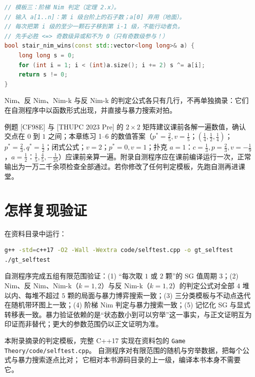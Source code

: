 \begin{lstlisting}[language=C++]
// 模板三：阶梯 Nim 判定（定理 2.x）。
// 输入 a[1..n]：第 i 级台阶上的石子数；a[0] 弃用（地面）。
// 每次把第 i 级的至少一颗石子移到第 i-1 级，不能行动者负。
// 先手必胜 <=> 奇数级异或和不为 0（只有奇数级参与！）
bool stair_nim_wins(const std::vector<long long>& a) {
    long long s = 0;
    for (int i = 1; i < (int)a.size(); i += 2) s ^= a[i];
    return s != 0;
}
\end{lstlisting}

Nim、反 Nim、Nim-k 与反 Nim-k 的判定公式各只有几行，不再单独摘录：它们在自测程序中以函数形式出现，并直接与暴力搜索对拍。

\begin{teach}[备课验证]
例题 [CF98E] 与 [THUPC 2023 Pre] 的 $2\times2$ 矩阵建议课前各解一遍数值，确认交点在 $0$ 到 $1$ 之间；本章练习 1--6 的数值答案（$p^{*}=\tfrac25,v=\tfrac15$；$(\tfrac14,\tfrac12,\tfrac14)$；$p^{*}=\tfrac23,q^{*}=\tfrac12$；闭式公式；$v=2$；$p^{*}=0,v=1$；扑克 $a=1$：$c=\tfrac13,p=\tfrac23,v=-\tfrac19$，$a=\tfrac12$：$\tfrac15,\tfrac45,-\tfrac1{25}$）应课前亲算一遍。附录自测程序应在课前编译运行一次，正常输出为一万二千余项检查全部通过。若你修改了任何判定模板，先跑自测再进课堂。
\end{teach}
\section{怎样复现验证}
在资料目录中运行：
\begin{lstlisting}[language=bash]
g++ -std=c++17 -O2 -Wall -Wextra code/selftest.cpp -o gt_selftest
./gt_selftest
\end{lstlisting}
自测程序完成五组有限范围验证：(1) “每次取 $1$ 或 $2$ 颗”的 SG 值周期 $3$；(2) Nim、反 Nim、Nim-k（$k=1,2$）与反 Nim-k（$k=1,2$）的判定公式对全部 $4$ 堆以内、每堆不超过 $5$ 颗的局面与暴力博弈搜索一致；(3) 三分类模板与不动点迭代在随机带环图上一致；(4) 阶梯 Nim 判定与暴力搜索一致；(5) 记忆化 SG 与显式转移表一致。暴力验证依赖的是“状态数小到可以穷举”这一事实，与正文证明互为印证而非替代；更大的参数范围仍以正文证明为准。


\begin{tip}[代码与验证脚本的位置]
本附录摘录的判定模板，完整 C++17 实现在资料包的 \texttt{Game Theory/code/selftest.cpp}。
自测程序对有限范围的随机与穷举数据，把每个公式与暴力搜索逐点比对；
它相对本书源码目录的上一级，编译本书本身不需要它。
\end{tip}
